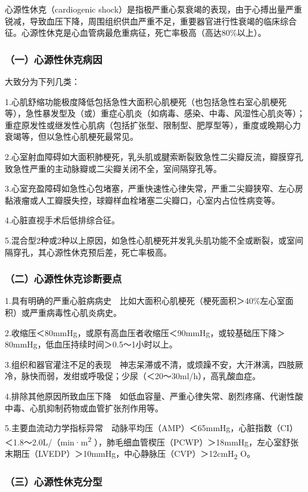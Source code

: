 心源性休克（cardiogenic
shock）是指极严重心泵衰竭的表现，由于心搏出量严重锐减，导致血压下降，周围组织供血严重不足，重要器官进行性衰竭的临床综合征。心源性休克是心血管病最危重病征，死亡率极高（高达80\%以上）。

\subsubsection{（一）心源性休克病因}

大致分为下列几类：

1.心肌舒缩功能极度降低包括急性大面积心肌梗死（也包括急性右室心肌梗死等），急性暴发型及（或）重症心肌炎（如病毒、感染、中毒、风湿性心肌炎等）；重症原发性或继发性心肌病（包括扩张型、限制型、肥厚型等），重度或晚期心力衰竭等，但以急性心肌梗死最常见。

2.心室射血障碍如大面积肺梗死，乳头肌或腱索断裂致急性二尖瓣反流，瓣膜穿孔致急性严重的主动脉瓣或二尖瓣关闭不全，室间隔穿孔等。

3.心室充盈障碍如急性心包堵塞，严重快速性心律失常，严重二尖瓣狭窄、左心房黏液瘤或人工瓣膜失控，球瓣样血栓堵塞二尖瓣口，心室内占位性病变等。

4.心脏直视手术后低排综合征。

5.混合型2种或2种以上原因，如急性心肌梗死并发乳头肌功能不全或断裂，或室间隔穿孔，其心源性休克预后差，死亡率极高。

\subsubsection{（二）心源性休克诊断要点}

1.具有明确的严重心脏病病史　比如大面积心肌梗死（梗死面积＞40\%左心室面积）或严重病毒性心肌炎病史。

2.收缩压＜80mmHg，或原有高血压者收缩压＜90mmHg，或较基础压下降＞80mmHg，低血压持续时间＞0.5～1小时以上。

3.组织和器官灌注不足的表现　神志呆滞或不清，或烦躁不安，大汗淋漓，四肢厥冷，脉快而弱，发绀或呼吸促；少尿（＜20～30ml/h），高乳酸血症。

4.排除其他原因所致血压下降　如低血容量、严重心律失常、剧烈疼痛、代谢性酸中毒、心肌抑制药物或血管扩张剂作用等。

5.主要血流动力学指标异常　动脉平均压（AMP）＜65mmHg，心脏指数（CI）＜1.8～2.0L/（min·m\textsuperscript{2}
），肺毛细血管楔压（PCWP）＞18mmHg，左心室舒张末期压（LVEDP）＞10mmHg，中心静脉压（CVP）＞12cmH\textsubscript{2}
O。

\subsubsection{（三）心源性休克分型}

